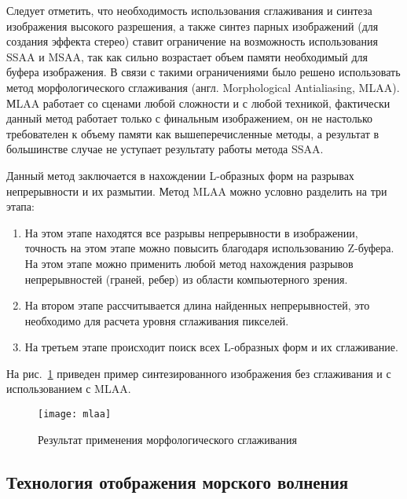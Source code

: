 Следует отметить, что необходимость использования сглаживания и синтеза изображения высокого разрешения, а также синтез парных изображений (для создания эффекта стерео) ставит ограничение на возможность использования SSAA и MSAA, так как сильно возрастает объем памяти необходимый для буфера изображения. В связи с такими ограничениями было решено использовать метод морфологического сглаживания (англ. Morphological Antialiasing, MLAA)\citep{mlaa}. МLAA работает со сценами любой сложности и с любой техникой, фактически данный метод работает только с финальным изображением, он не настолько требователен к объему памяти как вышеперечисленные методы, а результат в большинстве случае не уступает результату работы метода SSAA. 

Данный метод заключается в нахождении \glqq L\grqq-образных форм на  разрывах непрерывности и их размытии. Метод MLAA можно условно разделить на три этапа: 
\begin{enumerate}
\item	На этом этапе находятся все разрывы непрерывности в изображении, 
		точность на этом этапе можно повысить благодаря использованию Z-буфера. 
		На этом этапе можно применить любой метод нахождения разрывов непрерывностей 
		(граней, ребер) из области компьютерного зрения.
\item	На втором этапе рассчитывается длина найденных непрерывностей, это необходимо 
		для расчета уровня сглаживания пикселей. 
\item	На третьем этапе происходит поиск всех \glqq L\grqq-образных форм и их сглаживание.
\end{enumerate}

На рис.~\ref{mlaa} приведен пример синтезированного изображения без сглаживания и с использованием с MLAA.

\begin{figure}[ht]
\begin{center}
\texttt{[image: mlaa]}
\end{center}
\caption{Результат применения морфологического сглаживания}
\label{mlaa}
\end{figure}






\subsection{Технология отображения морского волнения}

